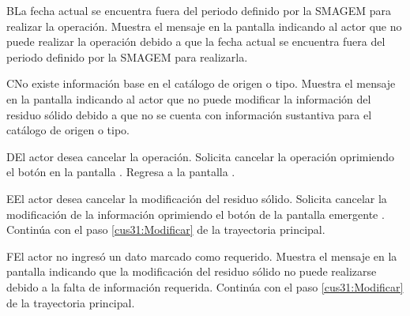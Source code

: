     \begin{UCtrayectoriaA}{B}{La fecha actual se encuentra fuera del periodo definido por la SMAGEM para realizar la operación.}
    \UCpaso[\UCsist] Muestra el mensaje  en la pantalla  indicando al actor que no puede realizar la operación debido a que la fecha actual se encuentra fuera del periodo definido por la SMAGEM para realizarla. 
 \end{UCtrayectoriaA}
 
 \begin{UCtrayectoriaA}{C}{No existe información base en el catálogo de origen o tipo.}
    \UCpaso[\UCsist] Muestra el mensaje  en la pantalla  indicando al actor que no puede modificar la información del residuo sólido debido a que no se cuenta con información sustantiva para el catálogo de origen o tipo.
 \end{UCtrayectoriaA}
 
    \begin{UCtrayectoriaA}{D}{El actor desea cancelar la operación.}
    \UCpaso[\UCactor] Solicita cancelar la operación oprimiendo el botón  en la pantalla .
    \UCpaso[\UCsist] Regresa a la pantalla . 
    \end{UCtrayectoriaA}
 
    \begin{UCtrayectoriaA}{E}{El actor desea cancelar la modificación del residuo sólido.}
    \UCpaso[\UCactor] Solicita cancelar la modificación de la información oprimiendo el botón  de la pantalla emergente .
    \UCpaso[] Continúa con el paso \ref{cus31:Modificar} de la trayectoria principal.    
 \end{UCtrayectoriaA}
 
    \begin{UCtrayectoriaA}{F}{El actor no ingresó un dato marcado como requerido.}    
    \UCpaso[\UCsist] Muestra el mensaje  en la pantalla  indicando que la modificación del residuo sólido no puede realizarse debido a la falta de información requerida.
    \UCpaso[] Continúa con el paso \ref{cus31:Modificar} de la trayectoria principal.     
    \end{UCtrayectoriaA}
 
